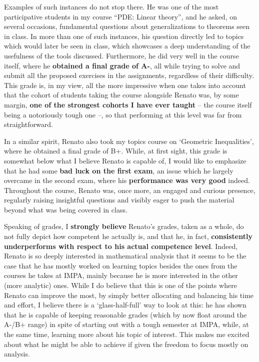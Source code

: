 \documentclass[a4paper,11pt]{letter}
\begin{document}
	Examples of such instances do not stop there. He was one of the most participative students in my course ``PDE: Linear theory'', and he asked, on several occasions, fundamental questions about generalizations to theorems seen in class.  In more than one of such instances, his question directly led to topics which would later be seen in class, which showcases a deep understanding of the usefulness of the tools discussed.  Furthermore, he did very well in the course itself, where he {\bf obtained a final grade of A-}, all while trying to solve and submit all the proposed exercises in the assignments, regardless of their difficulty. This grade is, in my view, all the more impressive when one takes into account that the cohort of students taking the course alongside Renato was, by some margin, {\bf one of the strongest cohorts I have ever taught} -- the course itself being a notoriously tough one --, so that performing at this level was far from straightforward.

In a similar spirit, Renato also took my topics course on `Geometric Inequalities', where he obtained a final grade of B+. While, at first sight, this grade is somewhat below what I believe Renato is capable of, I would like to emphasize that he had some {\bf bad luck on the first exam}, an issue which he largely overcame in the second exam, where his {\bf performance was very good} indeed. Throughout the course, Renato was, once more, an engaged and curious presence, regularly raising insightful questions and visibly eager to push the material beyond what was being covered in class.
	
	Speaking of grades, I {\bf strongly believe} Renato's grades, taken as a whole, do not fully depict how competent he actually is, and that he, in fact, {\bf consistently underperforms with respect to his actual competence level}.  Indeed, Renato is so deeply interested in mathematical analysis that it seems to be the case that he has mostly worked on learning topics besides the ones from the courses he takes at IMPA, mainly because he is more interested in the other (more analytic) ones.  While I do believe that this is one of the points where Renato can improve the most, by simply better allocating and balancing his time and effort,  I believe there is a `glass-half-full' way to look at this: he has shown that he is capable of keeping reasonable grades (which by now float around the A-/B+ range) in spite of starting out with a tough semester at IMPA, while, at the same time, learning more about his topic of interest.  This makes me excited about what he might be able to achieve if given the freedom to focus mostly on analysis.
	 
\end{document}
